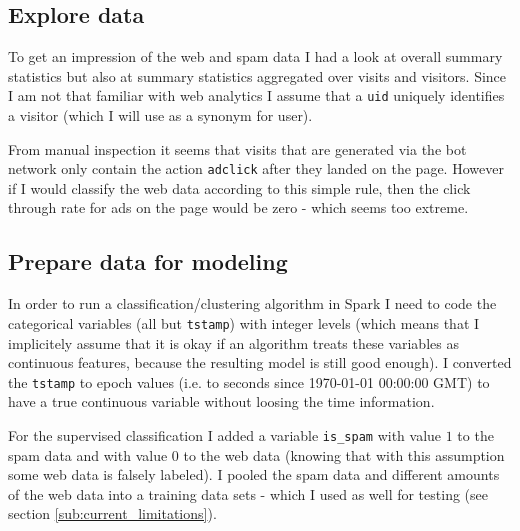 \documentclass{article}\usepackage[]{graphicx}\usepackage[]{color}
\begin{document}


\subsection{Explore data} %
\label{sub:explore_data}
To get an impression of the web and spam data I had a look at overall summary statistics but also at summary statistics aggregated over visits and visitors. Since I am not that familiar with web analytics I assume that a \verb+uid+ uniquely identifies a visitor (which I will use as a synonym for user). 

From manual inspection it seems that visits that are generated via the bot network only contain the action \verb+adclick+ after they landed on the page. However if I would classify the web data according to this simple rule, then the click through rate for ads on the page would be zero - which seems too extreme.


\subsection{Prepare data for modeling} %
\label{sub:prepare_data_for_modeling}
In order to run a classification/clustering algorithm in Spark I need to code the categorical variables (all but \verb+tstamp+) with integer levels (which means that I implicitely assume that it is okay if an algorithm treats these variables as continuous features, because the resulting model is still good enough).
I converted the \verb+tstamp+ to epoch values (i.e. to seconds since 1970-01-01 00:00:00 GMT) to have a true continuous variable without loosing the time information.

For the supervised classification I added a variable \verb+is_spam+ with value $1$ to the spam data and with value 0 to the web data (knowing that with this assumption some web data is falsely labeled). I pooled the spam data and different amounts of the web data into a training data sets - which I used as well for testing (see section \ref{sub:current_limitations}).

\end{document}
